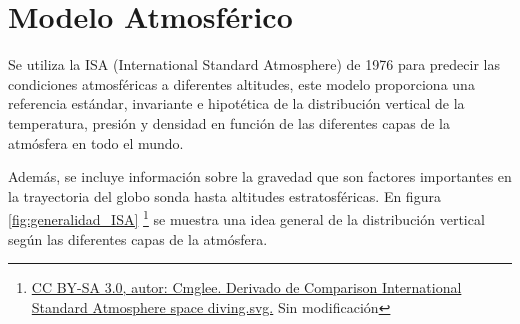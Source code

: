 \newpage

\section{Modelo Atmosférico} \label{sct:simulacion:modelo_atmoferico} 

Se utiliza la  ISA (International Standard Atmosphere) de 1976 \cite{isa_1976} para predecir las condiciones atmosféricas a diferentes altitudes, este modelo proporciona una referencia estándar, invariante e hipotética de la distribución vertical de la temperatura, presión y densidad en función de las diferentes capas de la atmósfera en todo el mundo.  

Además, se incluye información sobre la gravedad que son factores importantes en la trayectoria del globo sonda hasta altitudes estratosféricas. En figura \ref{fig:generalidad_ISA} \footnote{ \href{https://commons.wikimedia.org/wiki/File:International_Standard_Atmosphere.svg}{CC BY-SA 3.0, autor: Cmglee. Derivado de Comparison International Standard Atmosphere space diving.svg.} Sin modificación} se muestra una idea general de la distribución vertical según las diferentes capas de la atmósfera.

